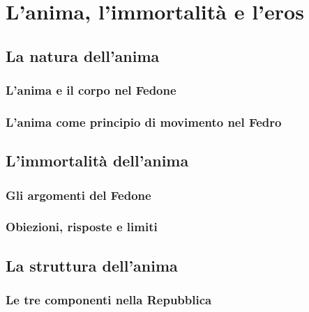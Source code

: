 \chapter{L'anima, l'immortalità e l'eros}
\label{cap:platone:anima-eros}

\section{La natura dell'anima}

\subsection{L'anima e il corpo nel Fedone}

\subsection{L'anima come principio di movimento nel Fedro}

\section{L'immortalità dell'anima}

\subsection{Gli argomenti del Fedone}

\subsection{Obiezioni, risposte e limiti}

\section{La struttura dell'anima}

\subsection{Le tre componenti nella Repubblica}

